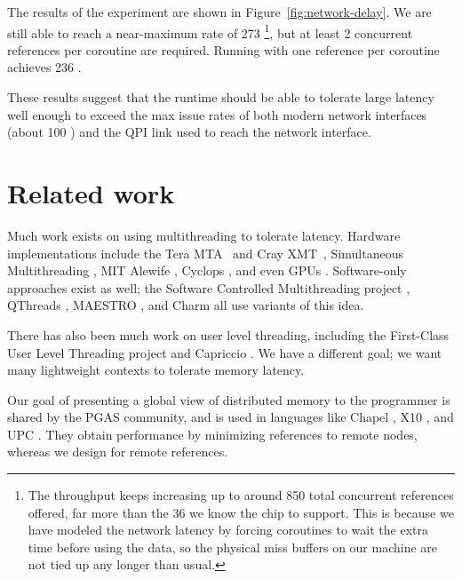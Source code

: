 \documentclass[10pt,nocopyrightspace,preprint]{sigplanconf}
\begin{document}
The results of the experiment are shown in
Figure~\ref{fig:network-delay}. We are still able to reach a
near-maximum rate of 273 \mrps\footnote{The throughput keeps increasing up to around 850 total concurrent references offered, far more than the 36 we know the chip to support. This is because we have modeled the network latency by forcing coroutines to wait the extra time before using the data, so the physical miss buffers on our machine are not tied up any longer than usual.}, but at least 2
concurrent references per coroutine are required. Running with one
reference per coroutine achieves 236 \mrps. 

These results suggest that the runtime should be able to tolerate
large latency well enough to exceed the max issue rates of both modern
network interfaces (about 100 \mrps) \cite{mellanox:press} and the QPI
link used to reach the network interface.




\section{Related work}
\label{sec:related}


Much work exists on using multithreading to tolerate latency. Hardware
implementations include the Tera MTA~\cite{tera} and Cray
XMT~\cite{feo-xmt}, Simultaneous Multithreading \cite{tullsen-smt},
MIT Alewife \cite{agarwal-alewife}, Cyclops \cite{almasi-cyclops}, and
even GPUs \cite{gpus}. Software-only approaches exist as well; the
Software Controlled Multithreading project \cite{mowry-scm}, QThreads
\cite{qthreads}, MAESTRO \cite{maestro}, and Charm \cite{charm} all
use variants of this idea.

There has also been much work on user level threading, including the First-Class
User Level Threading project \cite{ult} and Capriccio \cite{capriccio}. We have a
different goal; we want many lightweight contexts to tolerate memory
latency.

Our goal of presenting a global view of distributed memory to the
programmer is shared by the PGAS community, and is used in languages
like Chapel \cite{chapel}, X10 \cite{X10}, and UPC \cite{upc}. They
obtain performance by minimizing references to remote nodes, whereas we
design for remote references.
\end{document}
